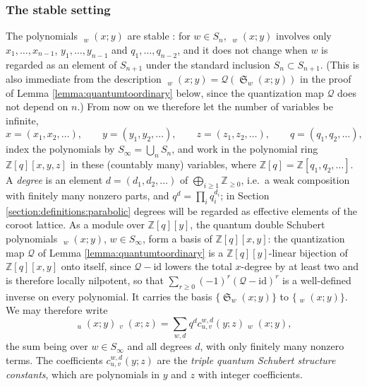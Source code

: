 \documentclass{amsart}
\theoremstyle{definition}
\theoremstyle{remark}
\numberwithin{equation}{section}
\DeclareMathOperator{\sch}{\mathfrak{S}}
\DeclareMathOperator{\qsch}{\widetilde{\mathfrak{S}}}
\begin{document}
\subsubsection*{The stable setting}
The polynomials $\qsch_w(x;y)$ are stable \cite{kirillov2000quantum}: for $w\in S_n$, $\qsch_w(x;y)$ involves only $x_1,\ldots,x_{n-1}$, $y_1,\ldots,y_{n-1}$ and $q_1,\ldots,q_{n-2}$, and it does not change when $w$ is regarded as an element of $S_{n+1}$ under the standard inclusion $S_n\subset S_{n+1}$. (This is also immediate from the description $\qsch_w(x;y)=\mathcal Q(\sch_w(x;y))$ in the proof of Lemma \ref{lemma:quantumtoordinary} below, since the quantization map $\mathcal Q$ does not depend on $n$.) From now on we therefore let the number of variables be infinite,
$$x=(x_1,x_2,\ldots),\qquad y=(y_1,y_2,\ldots),\qquad z=(z_1,z_2,\ldots),\qquad q=(q_1,q_2,\ldots),$$
index the polynomials by $S_\infty=\bigcup_nS_n$, and work in the polynomial ring $\mathbb Z[q][x,y,z]$ in these (countably many) variables, where $\mathbb Z[q]=\mathbb Z[q_1,q_2,\ldots]$. A \emph{degree} is an element $d=(d_1,d_2,\ldots)$ of $\bigoplus_{i\geq1}\mathbb Z_{\geq0}$, i.e.\ a weak composition with finitely many nonzero parts, and $q^d=\prod_iq_i^{d_i}$; in Section \ref{section:definitions:parabolic} degrees will be regarded as effective elements of the coroot lattice. As a module over $\mathbb{Z}[q][y]$, the quantum double Schubert polynomials $\qsch_w(x;y)$, $w\in S_\infty$, form a basis of $\mathbb{Z}[q][x,y]$: the quantization map $\mathcal Q$ of Lemma \ref{lemma:quantumtoordinary} is a $\mathbb Z[q][y]$-linear bijection of $\mathbb Z[q][x,y]$ onto itself, since $\mathcal Q-\mathrm{id}$ lowers the total $x$-degree by at least two and is therefore locally nilpotent, so that $\sum_{r\geq0}(-1)^r(\mathcal Q-\mathrm{id})^r$ is a well-defined inverse on every polynomial. It carries the basis $\{\sch_w(x;y)\}$ to $\{\qsch_w(x;y)\}$. We may therefore write
$$\qsch_u(x;y)\qsch_v(x;z)=\sum_{w,d}q^dc_{u,v}^{w,d}(y;z)\qsch_w(x;y),$$
the sum being over $w\in S_\infty$ and all degrees $d$, with only finitely many nonzero terms. The coefficients $c_{u,v}^{w,d}(y;z)$ are the \emph{triple quantum Schubert structure constants}, which are polynomials in $y$ and $z$ with integer coefficients.
\end{document}
